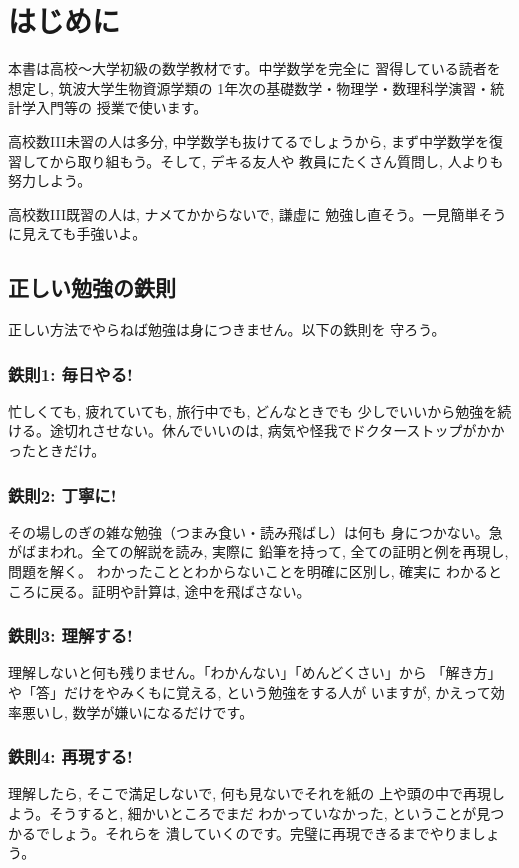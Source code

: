 \chapter{はじめに}


本書は高校〜大学初級の数学教材です。中学数学を完全に
習得している読者を想定し, 筑波大学生物資源学類の
1年次の基礎数学・物理学・数理科学演習・統計学入門等の
授業で使います。

高校数III未習の人は多分, 中学数学も抜けてるでしょうから, 
まず中学数学を復習してから取り組もう。そして, デキる友人や
教員にたくさん質問し, 人よりも努力しよう。

高校数III既習の人は, ナメてかからないで, 謙虚に
勉強し直そう。一見簡単そうに見えても手強いよ。

\section*{正しい勉強の鉄則}

正しい方法でやらねば勉強は身につきません。以下の鉄則を
守ろう。\\

\subsection*{鉄則1: 毎日やる!}
忙しくても, 疲れていても, 旅行中でも, どんなときでも
少しでいいから勉強を続ける。途切れさせない。休んでいいのは, 
病気や怪我でドクターストップがかかったときだけ。\\

\subsection*{鉄則2: 丁寧に!}
その場しのぎの雑な勉強（つまみ食い・読み飛ばし）は何も
身につかない。急がばまわれ。全ての解説を読み, 実際に
鉛筆を持って, 全ての証明と例を再現し, 問題を解く。
わかったこととわからないことを明確に区別し, 確実に
わかるところに戻る。証明や計算は, 途中を飛ばさない。\\

\subsection*{鉄則3: 理解する!}
理解しないと何も残りません。「わかんない」「めんどくさい」から
「解き方」や「答」だけをやみくもに覚える, という勉強をする人が
いますが, かえって効率悪いし, 数学が嫌いになるだけです。\\

\subsection*{鉄則4: 再現する!}
理解したら, そこで満足しないで, 何も見ないでそれを紙の
上や頭の中で再現しよう。そうすると, 細かいところでまだ
わかっていなかった, ということが見つかるでしょう。それらを
潰していくのです。完璧に再現できるまでやりましょう。\\

